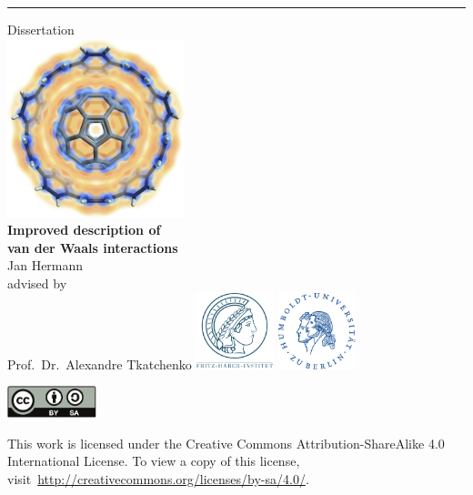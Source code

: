 
\pagestyle{fancy}






\listoftodos%
\cleardoublepage%

\begin{titlepage}
\sffamily\centering
\hrule
\vfill
{\Large Dissertation}\\
\vfill
\includegraphics[height=14em]{media/10cpp-c60-cloud.png}\\
\vfill
{\Huge\bfseries
Improved description of \\
van der Waals interactions}\\
\vfill
{\Large Jan Hermann}\\
\vspace{1em}
{\large advised by\\
Prof.\ Dr.\ Alexandre Tkatchenko}
\vfill
\includegraphics[height=6em]{media/logo-fhi.pdf}
\hfill
\includegraphics[height=6em]{media/logo-hu.pdf}
\end{titlepage}
\thispagestyle{empty}
\restoregeometry%
\clearpage

\vspace*{\fill}
\begin{center}
\small
\includegraphics[height=2.5em]{media/by-sa.pdf}
\vspace{.5em}

This work is licensed under the Creative Commons Attribution-ShareAlike 4.0 International License. To view a copy of this license, visit~\url{http://creativecommons.org/licenses/by-sa/4.0/}.
\end{center}
\cleardoublepage%

